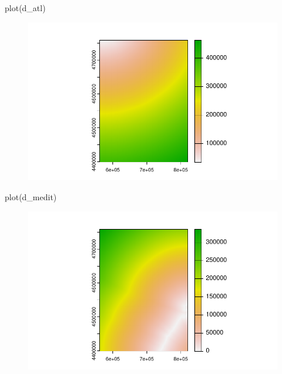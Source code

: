 \documentclass[
  letterpaper,
  DIV=11,
  numbers=noendperiod]{scrreprt}
\newenvironment{Shaded}{\begin{snugshade}}{\end{snugshade}}
\newcommand{\FunctionTok}[1]{\textcolor[rgb]{0.28,0.35,0.67}{#1}}
\newcommand{\NormalTok}[1]{\textcolor[rgb]{0.00,0.23,0.31}{#1}}
\begin{document}
\begin{Shaded}
\begin{Highlighting}[]
\FunctionTok{plot}\NormalTok{(d\_atl)}
\end{Highlighting}
\end{Shaded}

\begin{figure}[H]

{\centering \includegraphics{01_RegresionLineal_files/figure-pdf/unnamed-chunk-38-2.pdf}

}

\end{figure}

\begin{Shaded}
\begin{Highlighting}[]
\FunctionTok{plot}\NormalTok{(d\_medit)}
\end{Highlighting}
\end{Shaded}

\begin{figure}[H]

{\centering \includegraphics{01_RegresionLineal_files/figure-pdf/unnamed-chunk-38-3.pdf}

}

\end{figure}
\end{document}
